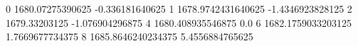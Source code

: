 0 1680.07275390625 -0.336181640625
1 1678.9742431640625 -1.4346923828125
2 1679.33203125 -1.076904296875
4 1680.408935546875 0.0
6 1682.1759033203125 1.7669677734375
8 1685.8646240234375 5.4556884765625
